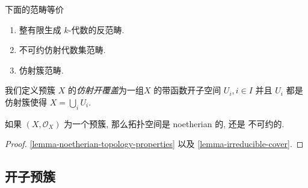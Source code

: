 \begin{corollary}
  下面的范畴等价
  \begin{enumerate}
    \item 整有限生成 \( k \)-代数的反范畴.
    \item 不可约仿射代数集范畴.
    \item 仿射簇范畴.
  \end{enumerate}
\end{corollary}

我们定义预簇 \( X \) 的\emph{仿射开覆盖}为一组\( X \) 的带函数开子空间 \( U_i, i
\in I\) 并且 \( U_i \) 都是仿射簇使得 \( X = \bigcup_i U_i \).

\begin{proposition}
  \label{proposition-prevariaties-properties}
  如果 \( (X, \mathscr{O}_X) \) 为一个预簇, 那么拓扑空间是 noetherian 的, 还是
  不可约的.
\end{proposition}
\begin{proof}
  \cref{lemma-noetherian-topology-properties} 以及
  \cref{lemma-irreducible-cover}.
\end{proof}


\subsection{开子预簇}

